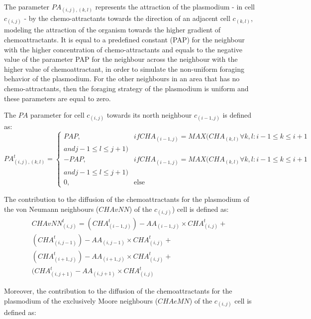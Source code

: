 \par
The parameter $PA_{(i, j),(k,l)}$ represents the attraction of the plasmodium - in cell $c_{(i,j)}$ - by the chemo-attractants towards the direction of an adjacent cell $c_{(k,l)}$, modeling the attraction of the organism towards the higher gradient of chemoattractants. It is equal to a predefined constant (PAP) for the neighbour with the higher concentration of chemo-attractants and equals to the negative value of the parameter PAP for the neighbour across the neighbour with the higher value of chemoattractant, in order to simulate the non-uniform foraging behavior of the plasmodium. For the other neighbours in an area that has no chemo-attractants, then the foraging strategy of the plasmodium is uniform and these parameters are equal to zero.

\par
The $PA$ parameter for cell $c_{(i,j)}$ towards its north neighbour $c_{(i-1,j)}$ is defined as:
\begin{equation}
PA^t_{(i, j),(k,l)}=
\begin{cases} 
PAP, & if CHA_{(i-1, j)} = MAX(CHA_{(k, l)} \forall k, l: i - 1 \leq k \leq i + 1 \\and j - 1 \leq l \leq j+1) \\ 
- PAP, & if CHA_{(i-1, j)} = MAX(CHA_{(k, l)} \forall k, l: i - 1 \leq k \leq i + 1 \\and j - 1 \leq l \leq j+1) \\ 
0, & \mbox{else}
\end{cases}
\end{equation}

\par
The contribution to the diffusion of the chemoattractants for the plasmodium of the von Neumann neighbours ($CHAvNN$) of the $c_{(i,j)}$) cell is defined as:
\begin{equation}
\begin{split}
CHAvNN^t_{(i, j)} = 
(CHA^t_{(i-1, j)}) - AA_{(i-1, j)} \times CHA^t_{(i, j)} +
\\(CHA^t_{(i, j-1)}) - AA_{(i, j-1)} \times CHA^t_{(i, j)} +
\\(CHA^t_{(i+1, j)}) - AA_{(i+1, j)} \times CHA^t_{(i, j)}  +
\\(CHA^t_{(i, j+1)} - AA_{(i, j+1)} \times CHA^t_{(i, j)}
\end{split}
\end{equation}

Moreover, the contribution to the diffusion of the chemoattractants for the plasmodium of the exclusively Moore neighbours ($CHAeMN$) of the $c_{(i,j)}$ cell is defined as:

